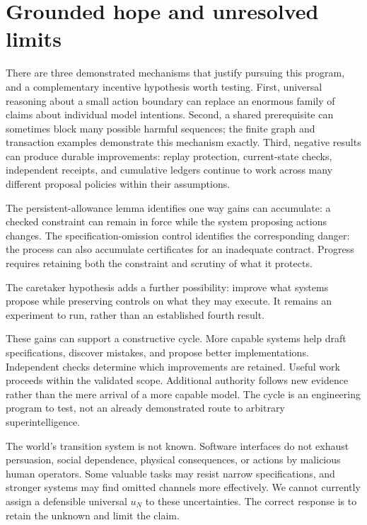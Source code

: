 \section{Grounded hope and unresolved limits}
\label{sec:hope}

There are three demonstrated mechanisms that justify pursuing this program, and a complementary incentive hypothesis worth testing. First, universal reasoning about a small action boundary can replace an enormous family of claims about individual model intentions. Second, a shared prerequisite can sometimes block many possible harmful sequences; the finite graph and transaction examples demonstrate this mechanism exactly. Third, negative results can produce durable improvements: replay protection, current-state checks, independent receipts, and cumulative ledgers continue to work across many different proposal policies within their assumptions.

The persistent-allowance lemma identifies one way gains can accumulate: a checked constraint can remain in force while the system proposing actions changes. The specification-omission control identifies the corresponding danger: the process can also accumulate certificates for an inadequate contract. Progress requires retaining both the constraint and scrutiny of what it protects.

The caretaker hypothesis adds a further possibility: improve what systems propose while preserving controls on what they may execute. It remains an experiment to run, rather than an established fourth result.

These gains can support a constructive cycle. More capable systems help draft specifications, discover mistakes, and propose better implementations. Independent checks determine which improvements are retained. Useful work proceeds within the validated scope. Additional authority follows new evidence rather than the mere arrival of a more capable model. The cycle is an engineering program to test, not an already demonstrated route to arbitrary superintelligence.

 The world's transition system is not known. Software interfaces do not exhaust persuasion, social dependence, physical consequences, or actions by malicious human operators. Some valuable tasks may resist narrow specifications, and stronger systems may find omitted channels more effectively. We cannot currently assign a defensible universal $u_N$ to these uncertainties. The correct response is to retain the unknown and limit the claim.

